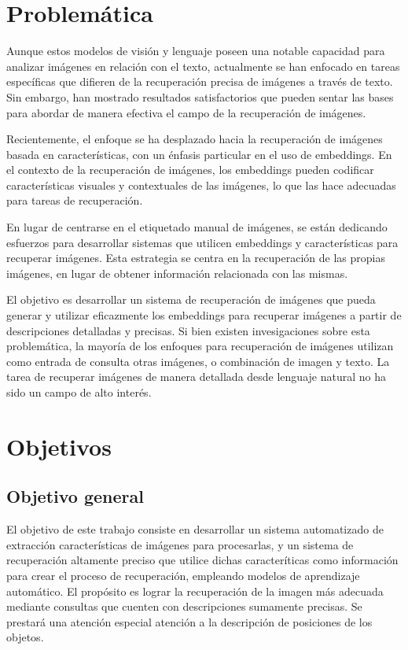 \section*{Problem\'atica}
Aunque estos modelos de visión y lenguaje poseen una notable capacidad para analizar imágenes en relación con el texto, actualmente se han enfocado en tareas específicas que difieren de la recuperación precisa de im\'agenes a trav\'es de texto. Sin embargo, han mostrado resultados satisfactorios que pueden sentar las bases para abordar de manera efectiva el campo de la recuperación de imágenes.

Recientemente, el enfoque se ha desplazado hacia la recuperación de imágenes basada en características, con un énfasis particular en el uso de embeddings. En el contexto de la recuperación de imágenes, los embeddings pueden codificar características visuales y contextuales de las imágenes, lo que las hace adecuadas para tareas de recuperación.

En lugar de centrarse en el etiquetado manual de imágenes, se están dedicando esfuerzos para desarrollar sistemas que utilicen embeddings y características para recuperar imágenes. Esta estrategia se centra en la recuperación de las propias imágenes, en lugar de obtener información relacionada con las mismas.

El objetivo es desarrollar un sistema de recuperación de imágenes que pueda generar y utilizar eficazmente los embeddings para recuperar imágenes a partir de descripciones detalladas y precisas. Si bien existen invesigaciones sobre esta problem\'atica, la mayor\'ia de los enfoques para recuperaci\'on de im\'agenes utilizan como entrada de consulta otras im\'agenes, o combinaci\'on de imagen y texto. La tarea de recuperar im\'agenes de manera detallada desde lenguaje natural no ha sido un campo de alto inter\'es.

\section*{Objetivos}

\subsection*{Objetivo general}

El objetivo de este trabajo consiste en desarrollar un sistema automatizado de extracci\'on caracter\'isticas de im\'agenes para procesarlas, y un sistema de recuperaci\'on altamente preciso que utilice dichas caracter\'iticas como informaci\'on para crear el proceso de recuperaci\'on, empleando modelos de aprendizaje autom\'atico. El prop\'osito es lograr la recuperaci\'on de la imagen m\'as adecuada mediante consultas que cuenten con descripciones sumamente precisas. Se prestar\'a una atenci\'on especial atenci\'on a la descripci\'on de posiciones de los objetos.

